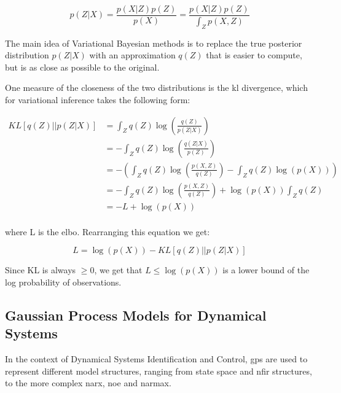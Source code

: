 \begin{equation}
    p(Z|X) = \frac{p(X|Z)p(Z)}{p(X)} = \frac{p(X|Z)p(Z)}{\int_Z p(X,Z)}
\end{equation}

The main idea of Variational Bayesian methods is to replace the true posterior
distribution $p(Z|X)$ with an approximation $q(Z)$ that is easier to compute,
but is as close as possible to the original. 

One measure of the closeness of the two distributions is the \acrfull{kl}
divergence, which for variational inference takes the following form:


\vspace{5pt}
\begin{equation}
    \begin{aligned}
        KL\left[q(Z)||p(Z|X)\right] 
        &= \int_Z q(Z)\log{\left(\frac{q(Z)}{p(Z|X)}\right)} \\
        &= - \int_Z q(Z)\log{\left(\frac{q(Z|X)}{p(Z)}\right)} \\
        &= - \left(
                \int_Z q(Z)\log{\left(\frac{p(X,Z)}{q(Z)}\right)}
                        - \int_Z q(Z)\log{\left(p(X)\right)}
            \right) \\
        &= - \int_Z q(Z) \log{\left(\frac{p(X,Z)}{q(Z)}\right)}
            + \log{\left(p(X)\right)}\int_Z q(Z) \\
        &= -L + \log{\left(p(X)\right)} \\
    \end{aligned}
\end{equation}
\vspace{5pt}

where L is the \acrshort{elbo}. Rearranging this equation we get:

\begin{equation}
    L = \log{\left(p(X)\right)} - KL\left[q(Z)||p(Z|X)\right] 
\end{equation}

Since KL is always $\geq 0$, we get that $L \leq \log{\left(p(X)\right)}$ is a
lower bound of the log probability of observations.

\subsection{Gaussian Process Models for Dynamical
Systems}\label{sec:gp_dynamical_system}

In the context of Dynamical Systems Identification and Control, \acrshort{gp}s
are used to represent different model structures, ranging from state
space and \acrfull{nfir} structures, to the more complex \acrfull{narx},
\acrfull{noe} and \acrfull{narmax}.


